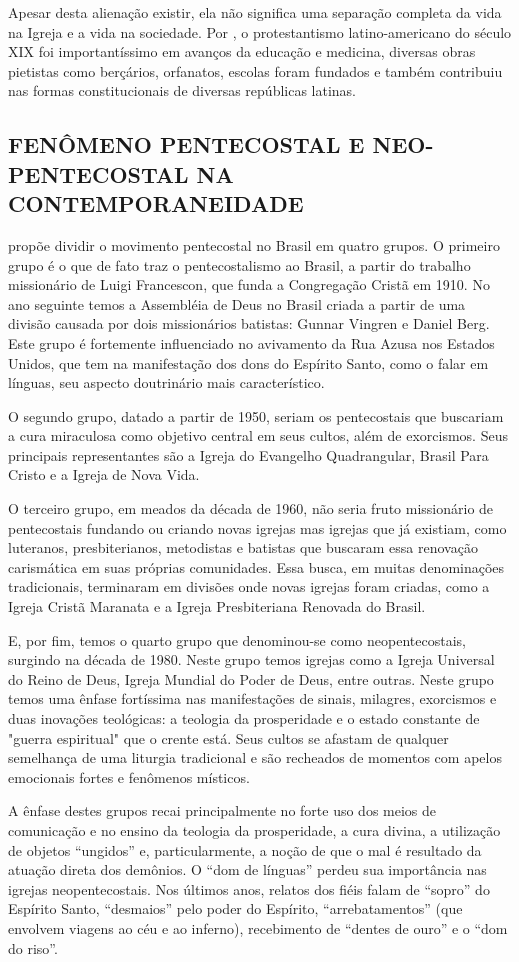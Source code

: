 \documentclass[
    article,            %
	12pt,				%
	oneside,			%
	a4paper,			%
	chapter=TITLE,		%
	section=TITLE,		%
	english,			%
	french,				%
	spanish,			%
	brazil				%
	]{abntex2}
\begin{document}
Apesar desta alienação existir, ela não significa uma separação completa da vida na Igreja e a vida na sociedade. Por , o protestantismo latino-americano do século XIX foi importantíssimo em avanços da educação e medicina, diversas obras pietistas como berçários, orfanatos, escolas foram fundados e também contribuiu nas formas constitucionais de diversas repúblicas latinas.
\subsection{FENÔMENO PENTECOSTAL E NEO-PENTECOSTAL NA CONTEMPORANEIDADE}
  propõe dividir o movimento pentecostal no Brasil em quatro grupos. O primeiro grupo é o que de fato traz o pentecostalismo ao Brasil, a partir do trabalho missionário de Luigi Francescon, que funda a Congregação Cristã em 1910. No ano seguinte temos a Assembléia de Deus no Brasil criada a partir de uma divisão causada por dois missionários batistas: Gunnar Vingren e Daniel Berg. Este grupo é fortemente influenciado no avivamento da Rua Azusa nos Estados Unidos, que tem na manifestação dos dons do Espírito Santo, como o falar em línguas, seu aspecto doutrinário mais característico.

 O segundo grupo, datado a partir de 1950, seriam os pentecostais que buscariam a cura miraculosa como objetivo central em seus cultos, além de exorcismos. Seus principais representantes são a Igreja do Evangelho Quadrangular, Brasil Para Cristo e a Igreja de Nova Vida.

 O terceiro grupo, em meados da década de 1960, não seria fruto missionário de pentecostais fundando ou criando novas igrejas mas igrejas que já existiam, como luteranos, presbiterianos, metodistas e batistas que buscaram essa renovação carismática em suas próprias comunidades. Essa busca, em muitas denominações tradicionais, terminaram em divisões onde novas igrejas foram criadas, como a Igreja Cristã Maranata e a Igreja Presbiteriana Renovada do Brasil.

 E, por fim, temos o quarto grupo que denominou-se como neopentecostais, surgindo na década de 1980. Neste grupo temos igrejas como a Igreja Universal do Reino de Deus, Igreja Mundial do Poder de Deus, entre outras. Neste grupo temos uma ênfase fortíssima nas manifestações de sinais, milagres, exorcismos e duas inovações teológicas: a teologia da prosperidade e o estado constante de "guerra espiritual" que o crente está. Seus cultos se afastam de qualquer semelhança de uma liturgia tradicional e são recheados de momentos com apelos emocionais fortes e fenômenos místicos.
 \begin{citacao}
 A ênfase destes grupos recai principalmente no forte uso dos meios de comunicação e no ensino da teologia da prosperidade, a cura divina, a utilização de objetos “ungidos” e, particularmente, a noção de que o mal é resultado da atuação direta dos demônios. O “dom de línguas” perdeu sua importância nas igrejas neopentecostais. Nos últimos anos, relatos dos fiéis falam de “sopro” do Espírito Santo, “desmaios” pelo poder do Espírito, “arrebatamentos” (que envolvem viagens ao céu e ao inferno), recebimento de “dentes de ouro” e o “dom do riso”. \cite[p.162]{FERREIRA}
 \end{citacao}
\end{document}
